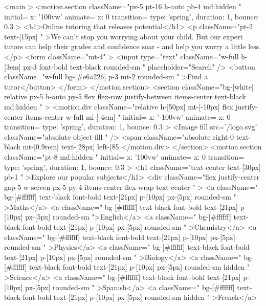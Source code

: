 <main  >
        <motion.section className="px-5 pt-16 h-auto pb-4 md:hidden " initial={{ x: '100vw' }} animate={{ x: 0 }} transition={{ type: 'spring', duration: 1, bounce: 0.3 }} >
          <h1>Online tutoring that releases potential</h1>
          <p className="pt-2 text-[15px] " >We can't stop you worrying about your child. But our expert tutors can help their grades and confidence soar - and help you worry a little less.</p>
          <form className="mt-4" >
            <input type="text" className="w-full h-[3em] px-3 font-bold text-black rounded-sm " placeholder="Search" />
            <button className="w-full bg-[#e6a226] p-3 mt-2 rounded-sm " >Find a tutor</button>
          </form>
        </motion.section>
        <section className="bg-[white] relative px-5 h-auto py-5  flex flex-row justify-between items-center text-black md:hidden  " >
          <motion.div className="relative h-[50px] mt-[-10px] flex justify-center items-center w-full ml-[-4em] " initial={{ x: '-100vw' }} animate={{ x: 0 }} transition={{ type: 'spring', duration: 1, bounce: 0.3 }} >
            <Image
              fill
              src={'/logo.svg'}
              className="absolute object-fill "
            />
            <span className="absolute right-0 text-black mt-[0.9rem] text-[28px] left-[85%
          </motion.div>
        </section>
        <motion.section className="pt-8 md:hidden  " initial={{ x: '100vw' }} animate={{ x: 0 }} transition={{ type: 'spring', duration: 1, bounce: 0.3 }} >
          <h1 className="text-center text-[30px] pb-1 " >Explore our popular subjects</h1>
          <div className="flex justify-center gap-5 w-screen px-5 py-4  items-center flex-wrap  text-center " >
            <a className=" bg-[#ffffff] text-black font-bold text-[21px] p-[10px] px-[5px] rounded-sm  " >Maths</a>
            <a className=" bg-[#ffffff] text-black font-bold text-[21px] p-[10px]  px-[5px] rounded-sm  ">English</a>
            <a className=" bg-[#ffffff] text-black font-bold text-[21px] p-[10px]  px-[5px] rounded-sm  " >Chemistry</a>
            <a className=" bg-[#ffffff] text-black font-bold text-[21px] p-[10px]  px-[5px] rounded-sm  " >Physics</a>
            <a className=" bg-[#ffffff] text-black font-bold text-[21px] p-[10px]  px-[5px] rounded-sm  " >Biology</a>
            <a className=" bg-[#ffffff] text-black font-bold text-[21px] p-[10px]  px-[5px] rounded-sm hidden " >Science</a>
            <a className=" bg-[#ffffff] text-black font-bold text-[21px] p-[10px] px-[5px]  rounded-sm  " >Spanish</a>
            <a className=" bg-[#ffffff] text-black font-bold text-[21px] p-[10px]  px-[5px] rounded-sm hidden " >French</a>
